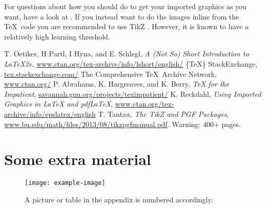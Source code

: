 \documentclass[11pt,twoside]{eitExjobb}
\begin{document}
For questions about how you should do to get your imported graphics as you want, have a look at \cite{cite:ImportedGraphics}. If you instead want to do the images inline from the \TeX\ code you are recommended to use TikZ \cite{cite:TikZ}. However, it is known to have a relatively high learning threshold.

\begin{thebibliography}{99}
 T. Oetiker, H Partl, I Hyna, and E. Schlegl, \textit{A (Not So) Short Introduction to \LaTeX2e}, \url{www.ctan.org/tex-archive/info/lshort/english/}
 \{\TeX\} StackExchange, \url{tex.stackexchange.com/}
 The Comprehensive \TeX\ Archive Network, \url{www.ctan.org/}
 P. Abrahams, K. Hargreaves, and K. Berry, \textit{TeX for the Impatient}, \url{savannah.gnu.org/projects/teximpatient/}
 K. Reckdahl, \textit{Using Imported Graphics in LaTeX and pdfLaTeX}, \url{www.ctan.org/tex-archive/info/epslatex/english}
 T. Tantau, \textit{The TikZ and PGF Packages}, \url{www.bu.edu/math/files/2013/08/tikzpgfmanual.pdf}. Warning: 400+ pages.
\end{thebibliography}


\appendix
\chapter{Some extra material}
\lipsum[1]
\begin{figure}[htbp]
  \centering
  \texttt{[image: example-image]}
  \caption{A picture or table in the appendix is numbered accordingly.}
  \label{fig:AppFig}
\end{figure}
\end{document}
